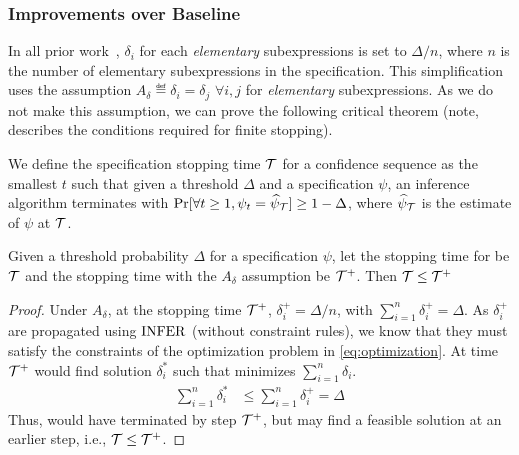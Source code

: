 \subsubsection{Improvements over Baseline}
In all prior work~\citep{albarghouthi2017fairsquare,albarghouthi2019fairness,bastani2019probabilistic}, $\delta_i$ for each \textit{elementary} subexpressions is set to $\Delta/n$, where $n$ is the number of elementary subexpressions in the specification.
This simplification uses the assumption $A_\delta \eqdef \delta_i = \delta_j$ $\forall i, j$ for \textit{elementary} subexpressions.
As we do not make this assumption, we can prove the following critical theorem (note,  describes the conditions required for finite stopping).

\begin{definition}
We define the specification stopping time ${\mathcal{T}}$ for a confidence sequence as the smallest $t$ such that given a threshold $\Delta$ and a specification $\psi$, an inference algorithm terminates with $\Pr[\forall t \geq 1, \psi_t = \widehat{\psi}_{\mathcal{T}}] \geq 1 - \Delta$, where $\widehat{\psi}_{{\mathcal{T}}}$ is the estimate of $\psi$ at ${\mathcal{T}}$.
\end{definition}

\begin{theorem}
\label{theorem:better-stopping}
Given a threshold probability $\Delta$ for a specification $\psi$, let the stopping time for \AVOIRmethodname{} be ${\mathcal{T}}$ and the stopping time with the $A_\delta$ assumption be ${\mathcal{T}}^+$. Then ${\mathcal{T}} \leq {\mathcal{T}}^+$
\end{theorem}
\begin{proof}
Under $A_\delta$, at the stopping time ${\mathcal{T}}^+$,  $\delta^+_i = \Delta/n$, with 
$\sum\limits_{i=1}^{n} \delta^+_i = \Delta$.
As $\delta_i^+$ are propagated using $\rm{INFER}$ (without constraint rules),
we know that they must satisfy the constraints of the optimization problem in  \cref{eq:optimization}. 
At time ${\mathcal{T}}^+$ \AVOIRmethodname{} would find solution $\delta^*_i$ such that minimizes $\sum\limits_{i=1}^{n} \delta_i$.
\begin{align*}
    \sum\limits_{i=1}^{n} \delta^*_i &\leq \sum\limits_{i=1}^{n} \delta^+_i 
                                     = \Delta
\end{align*}
Thus, \AVOIRmethodname{} would have terminated by step ${\mathcal{T}}^+$, but may find a feasible solution at an earlier step, i.e., ${\mathcal{T}} \leq {\mathcal{T}}^+$.
\end{proof}

